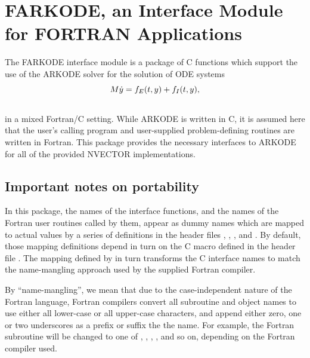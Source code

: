 \documentclass[letterpaper,10pt,english]{sphinxmanual}
\begin{document}
\chapter{FARKODE, an Interface Module for FORTRAN Applications}
\label{f_interface/index:farkode-an-interface-module-for-fortran-applications}\label{f_interface/index:fortraninterface}\label{f_interface/index::doc}
The FARKODE interface module is a package of C functions which
support the use of the ARKODE solver for the solution of ODE
systems
\begin{gather}
\begin{split}M \dot{y} = f_E(t,y) + f_I(t,y),\end{split}\notag\\\begin{split}\end{split}\notag
\end{gather}
in a mixed Fortran/C setting.  While ARKODE is written in C, it is
assumed here that the user's calling program and user-supplied
problem-defining routines are written in Fortran. This package
provides the necessary interfaces to ARKODE for all of the provided
NVECTOR implementations.


\section{Important notes on portability}
\label{f_interface/index:important-notes-on-portability}\label{f_interface/index:finterface-portability}
In this package, the names of the interface functions, and the names
of the Fortran user routines called by them, appear as dummy names
which are mapped to actual values by a series of definitions in the
header files , , , and
.  By default, those mapping definitions depend in turn
on the C macro  defined in the header file
.  The mapping defined by  in turn
transforms the C interface names to match the name-mangling approach
used by the supplied Fortran compiler.

By ``name-mangling'', we mean that due to the case-independent nature of
the Fortran language, Fortran compilers convert all subroutine and
object names to use either all lower-case or all upper-case
characters, and append either zero, one or two underscores as a prefix
or suffix the the name.  For example, the Fortran subroutine
 will be changed to one of ,
, , , and so on,
depending on the Fortran compiler used.
\end{document}
